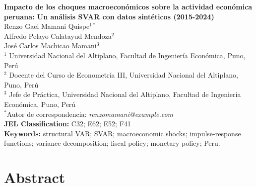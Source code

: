 \documentclass[12pt, a4paper]{article}
\begin{document}
\begin{titlepage}
\centering
\vspace*{2cm}

{\LARGE\bfseries Impacto de los choques macroeconómicos sobre la actividad económica peruana: Un análisis SVAR con datos sintéticos (2015-2024)}\\[1.5cm]

{\large
Renzo Gael Mamani Quispe$^{1*}$ \\
Alfredo Pelayo Calatayud Mendoza$^{2}$ \\
José Carlos Machicao Mamani$^{3}$
}\\[1cm]

{\small
$^{1}$ Universidad Nacional del Altiplano, Facultad de Ingeniería Económica, Puno, Perú \\
$^{2}$ Docente del Curso de Econometría III, Universidad Nacional del Altiplano, Puno, Perú \\
$^{3}$ Jefe de Práctica, Universidad Nacional del Altiplano, Facultad de Ingeniería Económica, Puno, Perú
}\\[1cm]

{\small $^{*}$Autor de correspondencia: \textit{renzomamani@example.com}}\\[1.5cm]

{\small
\textbf{JEL Classification:} C32; E62; E52; F41 \\
\textbf{Keywords:} structural VAR; SVAR; macroeconomic shocks; impulse-response functions; variance decomposition; fiscal policy; monetary policy; Peru.
}\\[1.5cm]

\vfill
\end{titlepage}

\section*{Abstract}
\end{document}
